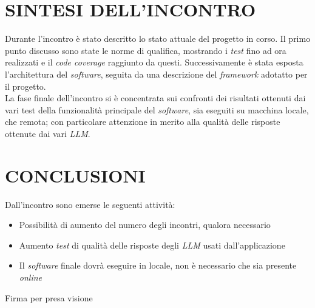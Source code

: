 \documentclass[5pt]{article}
\begin{document}
\section{SINTESI DELL'INCONTRO}
Durante l'incontro è stato descritto lo stato attuale del progetto in corso. 
Il primo punto discusso sono state le norme di qualifica, mostrando i \textit{test} fino ad ora realizzati e il \textit{code coverage} raggiunto da questi.
Successivamente è stata esposta l'architettura del \textit{software}, seguita da una descrizione del \textit{framework} adotatto per il progetto. \\
La fase finale dell'incontro si è concentrata sui confronti dei risultati ottenuti dai vari test della funzionalità principale del \textit{software}, 
sia eseguiti su macchina locale, che remota; con particolare attenzione in merito alla qualità delle risposte ottenute dai vari \textit{LLM}.



\section{CONCLUSIONI}
Dall'incontro sono emerse le seguenti attività: 
\begin{itemize}
    \item Possibilità di aumento del numero degli incontri, qualora necessario
    \item Aumento \textit{test} di qualità delle risposte degli \textit{LLM} usati dall'applicazione
    \item Il \textit{software} finale dovrà eseguire in locale, non è necessario che sia presente \textit{online}
\end{itemize}

\vspace{3em}
\begin{flushright}
	\begin{spacing}{1.5}
		Firma per presa visione\\
	\end{spacing}
\end{flushright}
\end{document}
